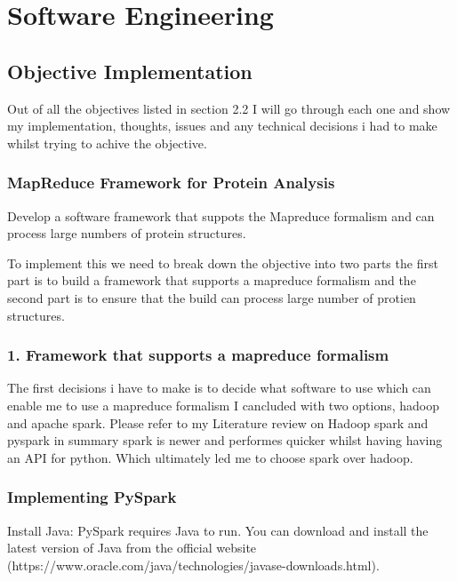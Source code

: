 \documentclass[]{final_report}
\begin{document}
\section{Software Engineering}
\subsection{Objective Implementation}

Out of all the objectives listed in section 2.2 I will go through each one and show my implementation, thoughts, issues and any technical decisions i had to make whilst trying to achive the objective.

\subsubsection{MapReduce Framework for Protein Analysis}

\begin{displayquote}
    Develop a software framework that suppots the Mapreduce formalism and can process
    large numbers of protein structures.
\end{displayquote}

To implement this we need to break down the objective into two parts the first part is to build a framework that supports a mapreduce formalism and the second part is to ensure that the build can process large number of protien structures. 

\subsubsection{1. Framework that supports a mapreduce formalism}

The first decisions i have to make is to decide what software to use which can enable me to use a mapreduce formalism I cancluded with two options, hadoop and apache spark. Please refer to my Literature review on Hadoop spark and pyspark in summary spark is newer and performes quicker whilst having having an API for python. Which ultimately led me to choose spark over hadoop.

\clearpage

\subsubsection{Implementing PySpark}

Install Java: PySpark requires Java to run. You can download and install the latest version of Java from the official website (https://www.oracle.com/java/technologies/javase-downloads.html).
\end{document}
